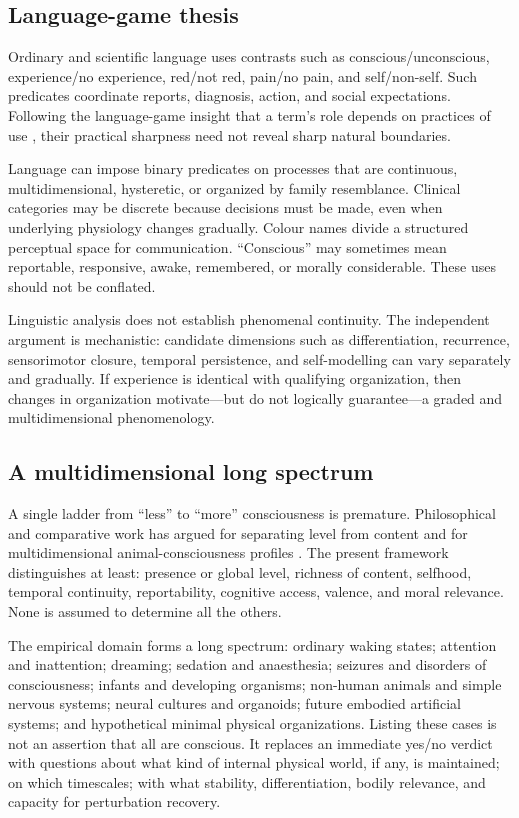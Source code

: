 \documentclass[
  11pt,
  a4paper,
]{article}
\begin{document}
\subsection{Language-game thesis}\label{language-game-thesis}

Ordinary and scientific language uses contrasts such as
conscious/unconscious, experience/no experience, red/not red, pain/no
pain, and self/non-self. Such predicates coordinate reports, diagnosis,
action, and social expectations. Following the language-game insight
that a term's role depends on practices of use \citep{wittgenstein1953},
their practical sharpness need not reveal sharp natural boundaries.

Language can impose binary predicates on processes that are continuous,
multidimensional, hysteretic, or organized by family resemblance.
Clinical categories may be discrete because decisions must be made, even
when underlying physiology changes gradually. Colour names divide a
structured perceptual space for communication. ``Conscious'' may
sometimes mean reportable, responsive, awake, remembered, or morally
considerable. These uses should not be conflated.

Linguistic analysis does not establish phenomenal continuity. The
independent argument is mechanistic: candidate dimensions such as
differentiation, recurrence, sensorimotor closure, temporal persistence,
and self-modelling can vary separately and gradually. If experience is
identical with qualifying organization, then changes in organization
motivate---but do not logically guarantee---a graded and
multidimensional phenomenology.

\subsection{A multidimensional long
spectrum}\label{a-multidimensional-long-spectrum}

A single ladder from ``less'' to ``more'' consciousness is premature.
Philosophical and comparative work has argued for separating level from
content and for multidimensional animal-consciousness profiles
\citep{bayne2016, birch2020}. The present framework distinguishes at
least: presence or global level, richness of content, selfhood, temporal
continuity, reportability, cognitive access, valence, and moral
relevance. None is assumed to determine all the others.

The empirical domain forms a long spectrum: ordinary waking states;
attention and inattention; dreaming; sedation and anaesthesia; seizures
and disorders of consciousness; infants and developing organisms;
non-human animals and simple nervous systems; neural cultures and
organoids; future embodied artificial systems; and hypothetical minimal
physical organizations. Listing these cases is not an assertion that all
are conscious. It replaces an immediate yes/no verdict with questions
about what kind of internal physical world, if any, is maintained; on
which timescales; with what stability, differentiation, bodily
relevance, and capacity for perturbation recovery.
\end{document}
